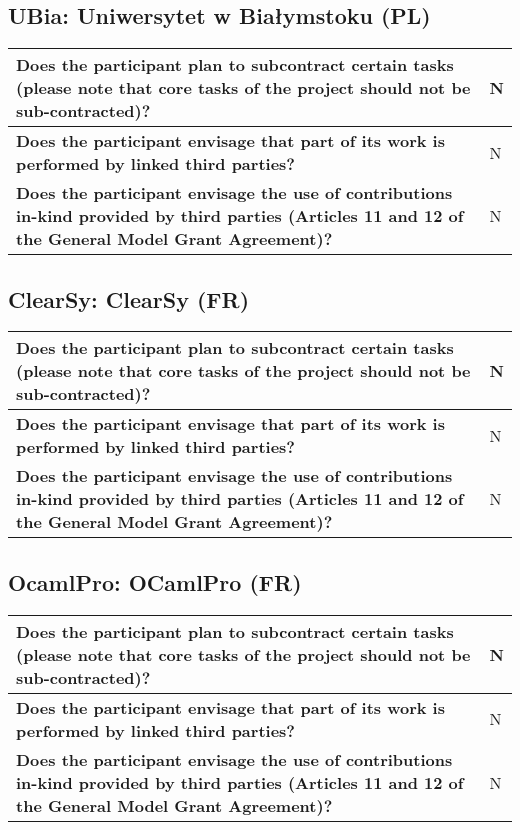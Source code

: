 \subsection*{UBia: Uniwersytet w Białymstoku (PL)}

\begin{longtable}{|p{}|p{}|}
\hline
{\bf Does the participant plan to subcontract certain tasks (please
  note that core tasks of the project should not be sub-contracted)?}
&
N
\\
\hline
{\bf Does the participant envisage that  part of its work is performed
  by linked third parties?}
&
N
\\
\hline
{\bf Does the participant envisage the use of contributions in-kind
provided by third parties (Articles 11 and 12 of the General Model
Grant Agreement)?}
&
N
\\
\hline
\end{longtable}


\subsection*{ClearSy: ClearSy (FR)}

\begin{longtable}{|p{}|p{}|}
\hline
{\bf Does the participant plan to subcontract certain tasks (please
  note that core tasks of the project should not be sub-contracted)?}
&
N
\\
\hline
{\bf Does the participant envisage that  part of its work is performed
  by linked third parties?}
&
N
\\
\hline
{\bf Does the participant envisage the use of contributions in-kind
provided by third parties (Articles 11 and 12 of the General Model
Grant Agreement)?}
&
N
\\
\hline
\end{longtable}


\subsection*{OcamlPro: OCamlPro (FR)}

\begin{longtable}{|p{}|p{}|}
\hline
{\bf Does the participant plan to subcontract certain tasks (please
  note that core tasks of the project should not be sub-contracted)?}
&
N
\\
\hline
{\bf Does the participant envisage that  part of its work is performed
  by linked third parties?}
&
N
\\
\hline
{\bf Does the participant envisage the use of contributions in-kind
provided by third parties (Articles 11 and 12 of the General Model
Grant Agreement)?}
&
N
\\
\hline
\end{longtable}


